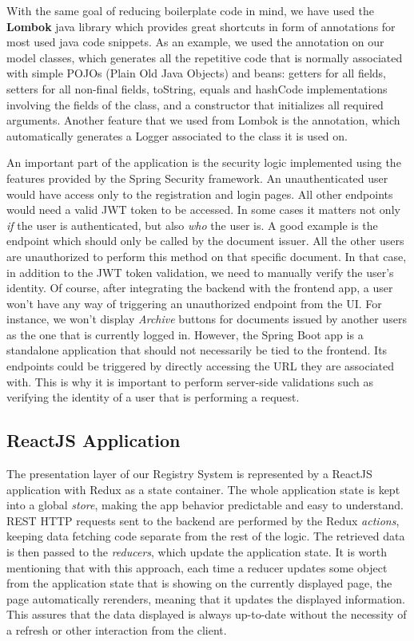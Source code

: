 With the same goal of reducing boilerplate code in mind, we have used the \textbf{Lombok} java library which provides great shortcuts in form of annotations for most used java code snippets. As an example, we used the  annotation on our model classes, which generates all the repetitive code that is normally associated with simple POJOs (Plain Old Java Objects) and beans: getters for all fields, setters for all non-final fields, toString, equals and hashCode implementations involving the fields of the class, and a constructor that initializes all required arguments. Another feature that we used from Lombok is the  annotation, which automatically generates a Logger associated to the class it is used on.

An important part of the application is the security logic implemented using the features provided by the Spring Security framework. An unauthenticated user would have access only to the registration and login pages. All other endpoints would need a valid JWT token to be accessed. In some cases it matters not only \textit{if} the user is authenticated, but also \textit{who} the user is. A good example is the  endpoint which should only be called by the document issuer. All the other users are unauthorized to perform this method on that specific document. In that case, in addition to the JWT token validation, we need to manually verify the user's identity. Of course, after integrating the backend with the frontend app, a user won't have any way of triggering an unauthorized endpoint from the UI. For instance, we won't display \textit{Archive} buttons for documents issued by another users as the one that is currently logged in. However, the Spring Boot app is a standalone application that should not necessarily be tied to the frontend. Its endpoints could be triggered by directly accessing the URL they are associated with. This is why it is important to perform server-side validations such as verifying the identity of a user that is performing a request.



\subsection{ReactJS Application}
\label{subsection:reactJsApplication}

The presentation layer of our Registry System is represented by a ReactJS application with Redux as a state container. The whole application state is kept into a global \textit{store}, making the app behavior predictable and easy to understand. REST HTTP requests sent to the backend are performed by the Redux \textit{actions}, keeping data fetching code separate from the rest of the logic. The retrieved data is then passed to the \textit{reducers}, which update the application state. It is worth mentioning that with this approach, each time a reducer updates some object from the application state that is showing on the currently displayed page, the page automatically rerenders, meaning that it updates the displayed information. This assures that the data displayed is always up-to-date without the necessity of a refresh or other interaction from the client.

